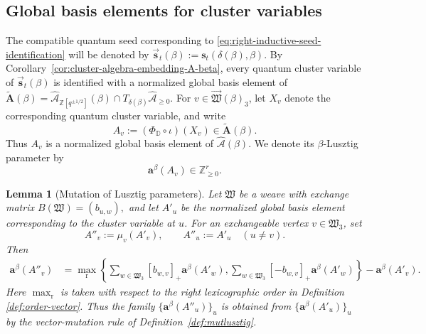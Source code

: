 \documentclass[12pt, reqno]{amsart}
\theoremstyle{plain}
\newtheorem{lemma}[theorem]{Lemma}
\theoremstyle{definition}
\numberwithin{equation}{section}
\newcommand{\ZZ}{\mathbb{Z}}
\newcommand{\DD}{\mathbb{D}}
\newcommand{\cA}{\mathcal{A}}
\begin{document}
\subsection{Global basis elements for cluster variables}
The compatible quantum seed corresponding to
\eqref{eq:right-inductive-seed-identification} will be denoted by
\(
    \overrightarrow{\mathbf s}_t(\beta)
    :=
    \mathbf s_t(\delta(\beta),\beta).
\)
 By
Corollary~\ref{cor:cluster-algebra-embedding-A-beta}, every quantum
cluster variable of
\(\overrightarrow{\mathbf s}_t(\beta)\) is identified with a
normalized global basis element of
\(
    \widetilde{\mathbf A}(\beta)
    =
    \widehat{\cA}_{\ZZ[q^{\pm1/2}]}(\beta)
    \cap
    T_{\delta(\beta)}\widehat{\cA}_{\geq0}.
\)
For \(v\in\overrightarrow{\mathfrak W}(\beta)_3\), let \(X_v\)
denote the corresponding quantum cluster variable, and write
\begin{equation}\label{eq:Av-global-basis-element}
    A_v
    :=
    (\Phi_{\DD}\circ\iota)(X_v)
    \in\widetilde{\mathbf A}(\beta).
\end{equation}
Thus \(A_v\) is a normalized global basis element of
\(\widehat{\cA}(\beta)\). We denote its \(\beta\)-Lusztig parameter by
\begin{equation}\label{eq:Lusztig-parameter-Av}
    \mathbf a^\beta(A_v)
    \in\ZZ_{\geq0}^r.
\end{equation}

\begin{lemma}[Mutation of Lusztig parameters]
\label{lem:Lusztig-parameter-mutation}
Let \(\mathfrak W\) be a weave with exchange matrix
\(
    B(\mathfrak W)=(b_{u,w}),
\)
and let \(A'_u\) be the normalized global basis element corresponding
to the cluster variable at \(u\). For an exchangeable vertex
\(v\in\mathfrak W_3\), set
\[
    A''_v:=\mu_v(A'_v),
    \qquad
    A''_u:=A'_u\quad (u\neq v).
\]
Then
\begin{equation}\label{eq:Lusztig-parameter-mutated-variable}
\begin{aligned}
    \mathbf a^\beta(A''_v)
    &=
    \max_{\mathrm r}
    \left\{
        \sum_{w\in\mathfrak W_3}
            [b_{w,v}]_+
            \mathbf a^\beta(A'_w),
        \sum_{w\in\mathfrak W_3}
            [-b_{w,v}]_+
            \mathbf a^\beta(A'_w)
    \right\}
    -\mathbf a^\beta(A'_v).
\end{aligned}
\end{equation}
Here \(\max_{\mathrm r}\) is taken with respect to the right
lexicographic order in Definition \ref{def:order-vector}. Thus the family
\(\{\mathbf a^\beta(A''_u)\}_u\) is obtained from
\(\{\mathbf a^\beta(A'_u)\}_u\) by the vector-mutation rule of
Definition~\ref{def:mutlusztig}.
\end{lemma}
\end{document}
